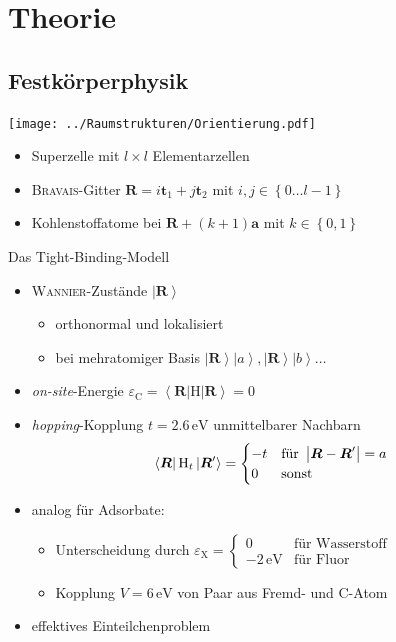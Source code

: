 \documentclass{beamer}
\newcommand \bra[1]{\left \langle #1 \right |}
\newcommand \ket[1]{\left | #1 \right \rangle}
\newcommand \braces[1]{\left \lbrace #1 \right \rbrace}
\newcommand \abs[1]{\left | #1 \right |}
\def \epsilon {\varepsilon}
\def \vec {\boldsymbol}
\newcommand \op[1]{\mathrm{#1}}
\def \eX {\varepsilon_\mathrm{X}}
\begin{document}
	\section{Theorie}
	
	\subsection{Festkörperphysik}
	
	\begin{frame}
		\texttt{[image: ../Raumstrukturen/Orientierung.pdf]}
		\begin{itemize}
			\item Superzelle mit $l \times l$ Elementarzellen
			\item \textsc{Bravais}-Gitter $\vec R = i \vec t_1 + j \vec t_2$ mit $i, j \in \braces{0 \dots l - 1}$
			\item Kohlenstoffatome bei $\vec R + (k + 1) \vec a$ mit $k \in \braces{0, 1}$
		\end{itemize}
	\end{frame}

	\begin{frame}{Das Tight-Binding-Modell}
		\begin{itemize}
			\item \textsc{Wannier}-Zustände $\ket{\vec R}$
			\begin{itemize}
				\item orthonormal und lokalisiert
				\item bei mehratomiger Basis $\ket{\vec R} \ket a, \ket{\vec R} \ket b \dots$
			\end{itemize}
			\item \emph{on-site}-Energie $\epsilon_\mathrm{C} = \bra{\vec R} \op H \ket{\vec R} = 0$
			\item \textit{hopping}-Kopplung $t = 2.6\,\mathrm{eV}$ unmittelbarer Nachbarn
			\begin{align*}
				\bra{\vec R} \op H_t \ket{\vec R\smash'} =
				\begin{cases}
					-t & \text{für } \abs{\vec R - \vec R'} = a \\ 0 & \text{sonst}
				\end{cases}
			\end{align*}
			\item analog für Adsorbate:
			\begin{itemize}
				\item Unterscheidung durch $\eX = \begin{cases} 0 & \text{für Wasserstoff} \\ -2\,\mathrm{eV} & \text{für Fluor} \end{cases}$
				\item Kopplung $V = 6\,\mathrm{eV}$ von Paar aus Fremd- und C-Atom
			\end{itemize}
			\item effektives Einteilchenproblem
		\end{itemize}
	\end{frame}
\end{document}
